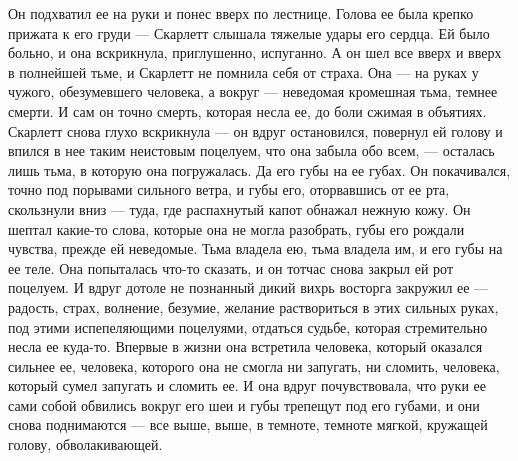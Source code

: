 Он подхватил ее на руки и понес вверх по лестнице. Голова ее была крепко прижата к его груди — Скарлетт слышала тяжелые удары его сердца. Ей было больно, и она вскрикнула, приглушенно, испуганно. А он шел все вверх и вверх в полнейшей тьме, и Скарлетт не помнила себя от страха. Она — на руках у чужого, обезумевшего человека, а вокруг — неведомая кромешная тьма, темнее смерти. И сам он точно смерть, которая несла ее, до боли сжимая в объятиях. Скарлетт снова глухо вскрикнула — он вдруг остановился, повернул ей голову и впился в нее таким неистовым поцелуем, что она забыла обо всем, — осталась лишь тьма, в которую она погружалась. Да его губы на ее губах. Он покачивался, точно под порывами сильного ветра, и губы его, оторвавшись от ее рта, скользнули вниз — туда, где распахнутый капот обнажал нежную кожу. Он шептал какие-то слова, которые она не могла разобрать, губы его рождали чувства, прежде ей неведомые. Тьма владела ею, тьма владела им, и его губы на ее теле. Она попыталась что-то сказать, и он тотчас снова закрыл ей рот поцелуем. И вдруг дотоле не познанный дикий вихрь восторга закружил ее — радость, страх, волнение, безумие, желание раствориться в этих сильных руках, под этими испепеляющими поцелуями, отдаться судьбе, которая стремительно несла ее куда-то. Впервые в жизни она встретила человека, который оказался сильнее ее, человека, которого она не смогла ни запугать, ни сломить, человека, который сумел запугать и сломить ее. И она вдруг почувствовала, что руки ее сами собой обвились вокруг его шеи и губы трепещут под его губами, и они снова поднимаются — все выше, выше, в темноте, темноте мягкой, кружащей голову, обволакивающей.




